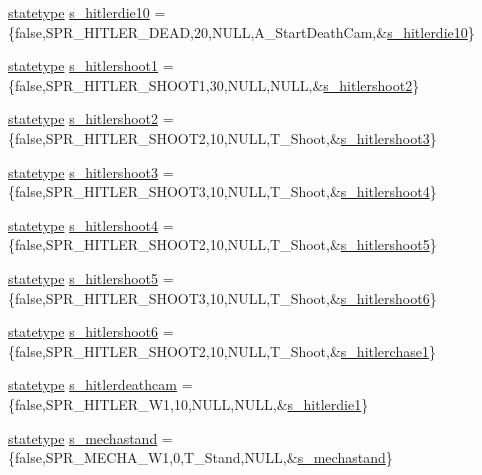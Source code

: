 \begin{DoxyCompactItemize}
\hyperlink{structstatestruct}{statetype} \hyperlink{WL__ACT2_8C_a248fc0709b6d2aae2cb7e042c095079f}{s\_\-hitlerdie10} = \{false,SPR\_\-HITLER\_\-DEAD,20,NULL,A\_\-StartDeathCam,\&\hyperlink{WL__ACT2_8C_a248fc0709b6d2aae2cb7e042c095079f}{s\_\-hitlerdie10}\}
\item 
\hyperlink{structstatestruct}{statetype} \hyperlink{WL__ACT2_8C_ab7f0053924ecd19131ed2db2bc175ebe}{s\_\-hitlershoot1} = \{false,SPR\_\-HITLER\_\-SHOOT1,30,NULL,NULL,\&\hyperlink{WL__ACT2_8C_ab868cc7665bad7da9e30d7e2438128cd}{s\_\-hitlershoot2}\}
\item 
\hyperlink{structstatestruct}{statetype} \hyperlink{WL__ACT2_8C_ab868cc7665bad7da9e30d7e2438128cd}{s\_\-hitlershoot2} = \{false,SPR\_\-HITLER\_\-SHOOT2,10,NULL,T\_\-Shoot,\&\hyperlink{WL__ACT2_8C_aa7eb2f5b42eac804651a502215491e57}{s\_\-hitlershoot3}\}
\item 
\hyperlink{structstatestruct}{statetype} \hyperlink{WL__ACT2_8C_aa7eb2f5b42eac804651a502215491e57}{s\_\-hitlershoot3} = \{false,SPR\_\-HITLER\_\-SHOOT3,10,NULL,T\_\-Shoot,\&\hyperlink{WL__ACT2_8C_a5786ccbe2530dcb569a71652a853c5b4}{s\_\-hitlershoot4}\}
\item 
\hyperlink{structstatestruct}{statetype} \hyperlink{WL__ACT2_8C_a5786ccbe2530dcb569a71652a853c5b4}{s\_\-hitlershoot4} = \{false,SPR\_\-HITLER\_\-SHOOT2,10,NULL,T\_\-Shoot,\&\hyperlink{WL__ACT2_8C_a3d98a48b636846fed366ace0fffb3cf7}{s\_\-hitlershoot5}\}
\item 
\hyperlink{structstatestruct}{statetype} \hyperlink{WL__ACT2_8C_a3d98a48b636846fed366ace0fffb3cf7}{s\_\-hitlershoot5} = \{false,SPR\_\-HITLER\_\-SHOOT3,10,NULL,T\_\-Shoot,\&\hyperlink{WL__ACT2_8C_a07a879b13567eaeb79ac350414f4952a}{s\_\-hitlershoot6}\}
\item 
\hyperlink{structstatestruct}{statetype} \hyperlink{WL__ACT2_8C_a07a879b13567eaeb79ac350414f4952a}{s\_\-hitlershoot6} = \{false,SPR\_\-HITLER\_\-SHOOT2,10,NULL,T\_\-Shoot,\&\hyperlink{WL__DEF_8H_aa89b8ca9d464e45092cc99529d5abef4}{s\_\-hitlerchase1}\}
\item 
\hyperlink{structstatestruct}{statetype} \hyperlink{WL__ACT2_8C_a033f50c9ac7a7e35061c91dbfd535d92}{s\_\-hitlerdeathcam} = \{false,SPR\_\-HITLER\_\-W1,10,NULL,NULL,\&\hyperlink{WL__DEF_8H_ad89c60be5f4190ae1c95e96b3eff37d2}{s\_\-hitlerdie1}\}
\item 
\hyperlink{structstatestruct}{statetype} \hyperlink{WL__ACT2_8C_a5cf381f84bbe8290df9af2682c9c03b8}{s\_\-mechastand} = \{false,SPR\_\-MECHA\_\-W1,0,T\_\-Stand,NULL,\&\hyperlink{WL__ACT2_8C_a5cf381f84bbe8290df9af2682c9c03b8}{s\_\-mechastand}\}

\end{DoxyCompactItemize}
